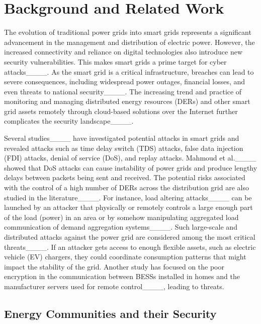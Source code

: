 \section{Background and Related Work}
\label{section:related_work}

The evolution of traditional power grids into smart grids represents a significant advancement in the management and distribution of electric power. However, the increased connectivity and reliance on digital technologies also introduce new security vulnerabilities. This makes smart grids a prime target for cyber attacks____. As the smart grid is a critical infrastructure, breaches can lead to severe consequences, including widespread power outages, financial losses, and even threats to national security____. The increasing trend and practice of monitoring and managing distributed energy resources (DERs) and other smart grid assets remotely through cloud-based solutions over the Internet further complicates the security landscape____.

Several studies____ have investigated potential attacks in smart grids and revealed attacks such as time delay switch (TDS) attacks, false data injection (FDI) attacks, denial of service (DoS), and replay attacks. Mahmoud et al.____ showed that DoS attacks can cause instability of power grids and produce lengthy delays between packets being sent and received. The potential risks associated with the control of a high number of DERs across the distribution grid are also studied in the literature____. For instance, load altering attacks____ can be launched by an attacker that physically or remotely controls a large enough part of the load (power) in an area or by somehow manipulating aggregated load communication of demand aggregation systems____. Such large-scale and distributed attacks against the power grid are considered among the most critical threats____. If an attacker gets access to enough flexible assets, such as electric vehicle (EV) chargers, they could coordinate consumption patterns that might impact the stability of the grid. Another study has focused on the poor encryption in the communication between BESSs installed in homes and the manufacturer servers used for remote control____, leading to threats. 

\subsection{Energy Communities and their Security}

